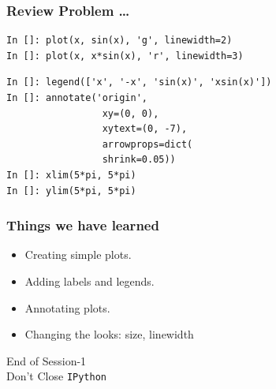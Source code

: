 \documentclass[14pt,compress]{beamer}
\newcommand{\typ}[1]{\lstinline{#1}}
\begin{document}
\begin{frame}[fragile]
\frametitle{Review Problem \ldots}
\small{
\begin{lstlisting}
In []: plot(x, sin(x), 'g', linewidth=2)
In []: plot(x, x*sin(x), 'r', linewidth=3)
\end{lstlisting}

\begin{lstlisting}
In []: legend(['x', '-x', 'sin(x)', 'xsin(x)'])
In []: annotate('origin', 
                 xy=(0, 0), 
                 xytext=(0, -7),
                 arrowprops=dict(
                 shrink=0.05))
In []: xlim(5*pi, 5*pi)
In []: ylim(5*pi, 5*pi)
\end{lstlisting}
}
\end{frame}
\begin{frame}
  \frametitle{Things we have learned}
  \begin{itemize}
  \item Creating simple plots.
  \item Adding labels and legends.
  \item Annotating plots.
  \item Changing the looks: size, linewidth
  \end{itemize}
\end{frame}
\begin{frame}[fragile]
  \begin{center}
  End of Session-1\\
  \alert{Don't Close \typ{IPython}}
  \end{center}
\end{frame}
\end{document}
